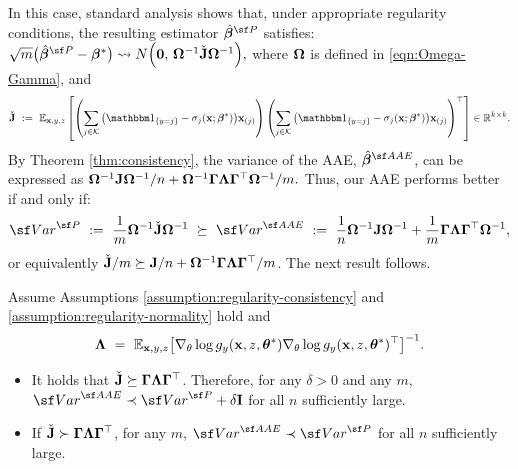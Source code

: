  In this case, standard analysis shows that, under appropriate regularity conditions, the resulting estimator $\hat{\betavec}^{\sf P}$ satisfies:
$
\sqrt{m}\big(\hat{\betavec}^{\sf P} - \betavec^*\big) \rightsquigarrow N\Big(\Ovec,\, \Omegavec^{-1}\check{\Jvec}\Omegavec^{-1}\Big),
$
where $\bm{\Omega}$ is defined in \eqref{eqn:Omega-Gamma}, and
$$
\check{\Jvec}~:=~\E_{\x,y,z}\left[
    \left(\sum_{j\in \Kscr}\big(\ind_{\{y = j\}} - \sigma_{j}(\x; \betavec^*)\big)\x_{(j)}\right)
    \left(\sum_{j\in \Kscr}\big(\ind_{\{y = j\}} - \sigma_{j}(\x; \betavec^*)\big)\x_{(j)}\right)^{\top}
\right] \in \Real^{k \times k}.
$$
By Theorem \ref{thm:consistency}, the variance of the AAE, $\hat{\betavec}^{\sf AAE}$, can be expressed as
$
\bm{\Omega}^{-1}\mathbf{J}\bm{\Omega}^{-1}/n + \bm{\Omega}^{-1} \bm{\Gamma}\bm{\Lambda}\bm{\Gamma}^{\top}\bm{\Omega}^{-1}/m.
$
Thus, our AAE performs better if and only if:
\begin{align}
\label{eqn:variance-comparison}
    {\sf Var}^{\sf P}~:=~ \frac{1}{m}\Omegavec^{-1}\check{\Jvec}\Omegavec^{-1} ~\succeq~ {\sf Var}^{\sf AAE}~:=~\frac{1}{n}\Omegavec^{-1}\Jvec\Omegavec^{-1} + \frac{1}{m}\Gammavec\Lambdavec\Gammavec^{\top}\Omegavec^{-1},
\end{align}
or equivalently $\check{\mathbf{J}}/m \succeq {\mathbf{J}}/n + \bm{\Omega}^{-1}\bm{\Gamma}\bm{\Lambda}\bm{\Gamma}^{\top}/m$.
The next result follows. 

\begin{prop} \label{prop:weak-dom}
Assume Assumptions \ref{assumption:regularity-consistency} and \ref{assumption:regularity-normality} hold and $$\bm{\Lambda} ~=~\mathbb{E}_{\mathbf{x},y,z}\big[
    \nabla_{\theta} \log g_y(\mathbf{x}, z, \bm{\theta}^*)
    \nabla_{\theta} \log g_y(\mathbf{x}, z, \bm{\theta}^*)^{\top}
    \big]^{-1}.$$ 
    \begin{itemize}
        \item [$(i)$] It holds that $\check{\mathbf{J}} \succeq \bm{\Gamma}\bm{\Lambda}\bm{\Gamma}^{\top}$. Therefore, for any $\delta > 0$ and any $m$, ${\sf Var}^{\sf AAE} \prec {\sf Var}^{\sf P} + \delta \mathbf{I}$ for all $n$ sufficiently large. 
    \item [$(ii)$] If $\check{\mathbf{J}} \succ \bm{\Gamma}\bm{\Lambda}\bm{\Gamma}^{\top}$, for any $m$, ${\sf Var}^{\sf AAE} \prec {\sf Var}^{\sf P}$ for all $n$ sufficiently large. 
    \end{itemize}
\end{prop}


